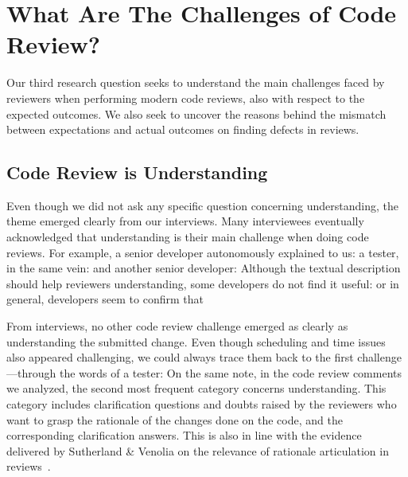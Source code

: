 
\section{What Are The Challenges of Code Review?} \label{sec:challenges}


Our third research question seeks to understand the main challenges faced by reviewers when performing modern code reviews, also with respect to the expected outcomes. We also seek to uncover the reasons behind the mismatch between expectations and actual outcomes on finding defects in reviews.


\subsection{Code Review is Understanding}

Even though we did not ask any specific question concerning understanding, the theme emerged clearly from our interviews. Many interviewees eventually acknowledged that understanding is their main challenge when doing code reviews. For example, a senior developer autonomously explained to us:  a tester, in the same vein:  and another senior developer:  Although the textual description should help reviewers understanding, some developers do not find it useful:  or  in general, developers seem to confirm that 

From interviews, no other code review challenge emerged as clearly as understanding the submitted change. Even though scheduling and time issues also appeared challenging, we could always trace them back to the first challenge—through the words of a tester:  On the same note, in the code review comments we analyzed, the second most frequent category concerns understanding. This category includes clarification questions and doubts raised by the reviewers who want to grasp the rationale of the changes done on the code, and the corresponding clarification answers. This is also in line with the evidence delivered by Sutherland \& Venolia on the relevance of rationale articulation in reviews~\cite{sutherland2009can}.


